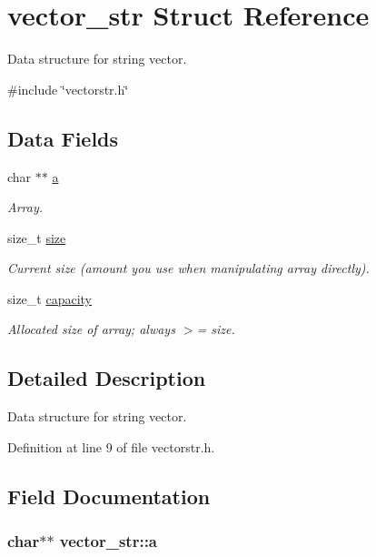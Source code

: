 \hypertarget{structvector__str}{\section{vector\-\_\-str \-Struct \-Reference}
\label{structvector__str}
}


\-Data structure for string vector.  




{\ttfamily \#include \char`\"{}vectorstr.\-h\char`\"{}}

\subsection*{\-Data \-Fields}
\begin{DoxyCompactItemize}
\item 
char $\ast$$\ast$ \hyperlink{structvector__str_a91f064ecae5d4f739f8aabd97fe6ddc2}{a}
\begin{DoxyCompactList}\small\item\em \-Array. \end{DoxyCompactList}\item 
size\-\_\-t \hyperlink{structvector__str_a63d4c1a5373481aa4ba9d4ee8252c748}{size}
\begin{DoxyCompactList}\small\item\em \-Current size (amount you use when manipulating array directly). \end{DoxyCompactList}\item 
size\-\_\-t \hyperlink{structvector__str_a8a52905a505acbcb9176be3eb6cf37f8}{capacity}
\begin{DoxyCompactList}\small\item\em \-Allocated size of array; always $>$= size. \end{DoxyCompactList}\end{DoxyCompactItemize}


\subsection{\-Detailed \-Description}
\-Data structure for string vector. 



\-Definition at line 9 of file vectorstr.\-h.



\subsection{\-Field \-Documentation}
\hypertarget{structvector__str_a91f064ecae5d4f739f8aabd97fe6ddc2}{
\subsubsection[{a}]{\setlength{\rightskip}{0pt plus 5cm}char$\ast$$\ast$ {\bf vector\-\_\-str\-::a}}}\label{structvector__str_a91f064ecae5d4f739f8aabd97fe6ddc2}


